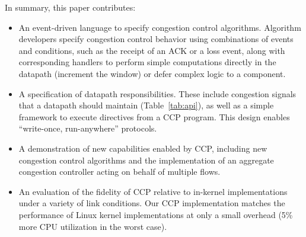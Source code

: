 In summary, this paper contributes:

\begin{itemize}
\item An event-driven language to specify congestion control
  algorithms. Algorithm developers specify congestion control behavior using
  combinations of events and conditions, such as the receipt of an
  ACK or a loss event, along with corresponding handlers to perform
  simple computations directly in the datapath (\eg increment the window) or defer
  complex logic to a \userspace component.

\item A specification of datapath responsibilities. These include congestion
  signals that a datapath should maintain (Table~\ref{tab:api}), as
  well as a simple framework to execute directives from a CCP program. This
  design enables ``write-once, run-anywhere'' protocols.

\item A demonstration of new capabilities enabled by CCP, including
   new congestion control algorithms and the implementation of an
  aggregate congestion controller acting on behalf of multiple flows.

\item An evaluation of the fidelity of CCP relative to in-kernel
  implementations under a variety of link conditions. Our CCP implementation
  matches the performance of Linux kernel implementations at only a small
  overhead (5\% more CPU utilization in the worst case).

\end{itemize}
